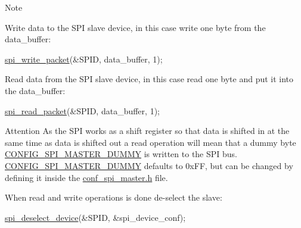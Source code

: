 \begin{DoxyEnumerate}
\begin{DoxyItemize}
\begin{DoxyNote}{Note}
\end{DoxyNote}

\end{DoxyItemize}
\item Write data to the S\-P\-I slave device, in this case write one byte from the data\-\_\-buffer\-:
\begin{DoxyItemize}
\item 
\begin{DoxyCode}
        \hyperlink{group__xmega__spi__master__group_ga60595beff80eae31c8dad32a8720865a}{spi\_write\_packet}(&SPID, data\_buffer, 1);
\end{DoxyCode}

\end{DoxyItemize}
\item Read data from the S\-P\-I slave device, in this case read one byte and put it into the data\-\_\-buffer\-:
\begin{DoxyItemize}
\item 
\begin{DoxyCode}
        \hyperlink{group__xmega__spi__master__group_ga504ee6688009acff607e0304cc59278d}{spi\_read\_packet}(&SPID, data\_buffer, 1);
\end{DoxyCode}

\item \begin{DoxyAttention}{Attention}
As the S\-P\-I works as a shift register so that data is shifted in at the same time as data is shifted out a read operation will mean that a dummy byte \hyperlink{group__xmega__spi__master__group_ga64f5ff62d19aab1a97cc5e72e062be49}{C\-O\-N\-F\-I\-G\-\_\-\-S\-P\-I\-\_\-\-M\-A\-S\-T\-E\-R\-\_\-\-D\-U\-M\-M\-Y} is written to the S\-P\-I bus. \hyperlink{group__xmega__spi__master__group_ga64f5ff62d19aab1a97cc5e72e062be49}{C\-O\-N\-F\-I\-G\-\_\-\-S\-P\-I\-\_\-\-M\-A\-S\-T\-E\-R\-\_\-\-D\-U\-M\-M\-Y} defaults to 0x\-F\-F, but can be changed by defining it inside the \hyperlink{conf__spi__master_8h}{conf\-\_\-spi\-\_\-master.\-h} file.
\end{DoxyAttention}

\end{DoxyItemize}
\item When read and write operations is done de-\/select the slave\-:
\begin{DoxyItemize}
\item 
\begin{DoxyCode}
        \hyperlink{group__xmega__spi__master__group_gad528d94d606bda0fa6503f77a6a7bb78}{spi\_deselect\_device}(&SPID, &spi\_device\_conf);
\end{DoxyCode}
 
\end{DoxyItemize}
\end{DoxyEnumerate}